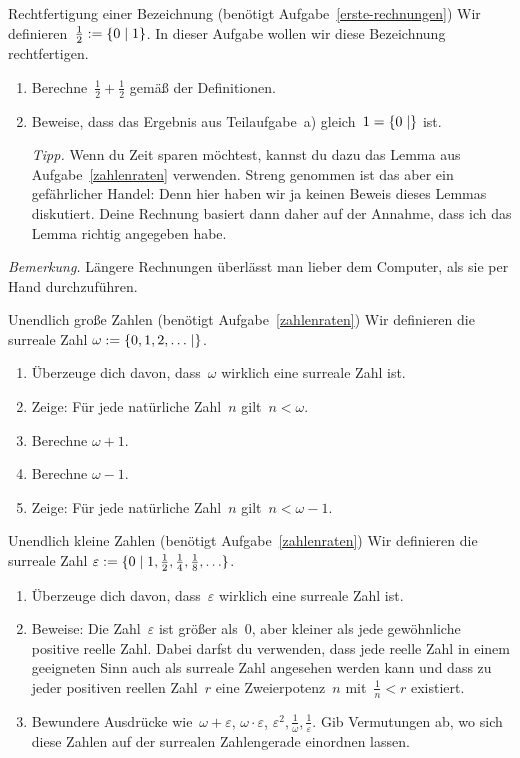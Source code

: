 \documentclass{zirkelblatt}
\begin{document}
\begin{aufgabe}{Rechtfertigung einer Bezeichnung (benötigt Aufgabe~\ref{erste-rechnungen})}
Wir definieren~$\tfrac{1}{2} := \{ 0 \mathrel{|} 1 \}$. In dieser Aufgabe wollen wir diese
Bezeichnung rechtfertigen.
\begin{enumerate}
\item Berechne~$\tfrac{1}{2} + \tfrac{1}{2}$ gemäß der Definitionen.
\item Beweise, dass das Ergebnis aus Teilaufgabe~a) gleich~$1 = \{ 0 \mathrel{|}  \}$ ist.

\emph{Tipp.} Wenn du Zeit sparen möchtest, kannst du dazu das Lemma aus
Aufgabe~\ref{zahlenraten} verwenden. Streng genommen ist das aber ein
gefährlicher Handel: Denn hier haben wir ja keinen Beweis dieses Lemmas
diskutiert. Deine Rechnung basiert dann daher auf der Annahme, dass ich das
Lemma richtig angegeben habe.
\end{enumerate}

\emph{Bemerkung.} Längere Rechnungen überlässt man lieber dem Computer, als sie
per Hand durchzuführen.
\end{aufgabe}

\begin{aufgabe}{Unendlich große Zahlen (benötigt Aufgabe~\ref{zahlenraten})}
\label{transfinit}
Wir definieren die surreale Zahl
$\omega := \{ 0, 1, 2, \ldots \mathrel{|}  \}$.
\begin{enumerate}
\item Überzeuge dich davon, dass~$\omega$ wirklich eine surreale Zahl ist.
\item Zeige: Für jede natürliche Zahl~$n$ gilt~$n < \omega$.
\item Berechne $\omega + 1$.
\item Berechne $\omega - 1$.
\item Zeige: Für jede natürliche Zahl~$n$ gilt~$n < \omega - 1$.
\end{enumerate}
\end{aufgabe}

\begin{aufgabe}{Unendlich kleine Zahlen (benötigt Aufgabe~\ref{zahlenraten})}
\label{infinitesimal}
Wir definieren die surreale Zahl
$\varepsilon := \{ 0 \mathrel{|} 1, \tfrac{1}{2}, \tfrac{1}{4}, \tfrac{1}{8}, \ldots \}$.
\begin{enumerate}
\item Überzeuge dich davon, dass~$\varepsilon$ wirklich eine surreale Zahl ist.
\item Beweise: Die Zahl~$\varepsilon$ ist größer als~$0$, aber kleiner als jede
gewöhnliche positive reelle Zahl. Dabei darfst du verwenden, dass jede reelle
Zahl in einem geeigneten Sinn auch als surreale Zahl angesehen werden kann und
dass zu jeder positiven reellen Zahl~$r$ eine Zweierpotenz~$n$
mit~$\tfrac{1}{n} < r$ existiert.
\item Bewundere Ausdrücke wie~$\omega + \varepsilon$, $\omega \cdot
\varepsilon$, $\varepsilon^2, \tfrac{1}{\omega}, \tfrac{1}{\varepsilon}$. Gib
Vermutungen ab, wo sich diese Zahlen auf der
surrealen Zahlengerade einordnen lassen.
\end{enumerate}
\end{aufgabe}
\end{document}
